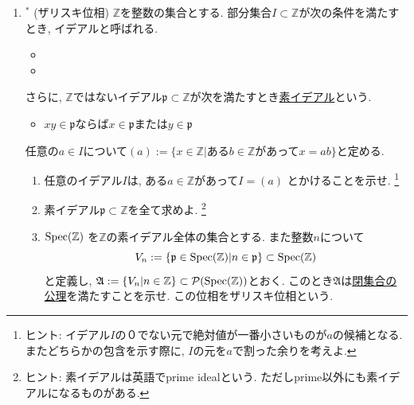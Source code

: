 \documentclass[dvipdfmx,a4paper,11pt]{article}
\newcommand{\Z}{\mathbb{Z}}
\theoremstyle{definition}
\begin{document}
\begin{enumerate}[label=\textbf{問}\ref*{sec-open}.\arabic*]
\item $^{*}$ \label{Zariski_topology} (ザリスキ位相)
$\Z$を整数の集合とする.
部分集合$I \subset \Z$が次の条件を満たすとき, イデアルと呼ばれる.
\begin{itemize}
	\setlength{\parskip}{0cm}
	\setlength{\itemsep}{0pt} 
\item {}
\item \text{$x\in I$, $a \in \Z$ならば$a x \in I$}
\end{itemize}
さらに, $\Z$ではないイデアル$\mathfrak{p} \subset \Z$が次を満たすとき\underline{素イデアル}という.
\begin{itemize}
	\setlength{\parskip}{0cm}
	\setlength{\itemsep}{0pt} 
\item $x y \in \mathfrak{p}$ならば$x \in \mathfrak{p}$または$y \in \mathfrak{p}$
\end{itemize}
任意の$a \in I$について$(a) :=  \{ x \in \Z | \text{ある$b \in \Z$があって$x =ab$}\}$と定める.
\begin{enumerate}
\setlength{\parskip}{0cm}
\setlength{\itemsep}{0pt} 
\item 任意のイデアル$I$は, ある$a \in \Z$があって$I = (a)$
とかけることを示せ. 
\footnote{ヒント: イデアル$I$の０でない元で絶対値が一番小さいものが$a$の候補となる. またどちらかの包含を示す際に, $I$の元を$a$で割った余りを考えよ. }
\item 素イデアル$\mathfrak{p}  \subset \Z$を全て求めよ. \footnote{ヒント: 素イデアルは英語でprime idealという. ただしprime以外にも素イデアルになるものがある.}
\item ${\rm Spec}(\Z)$ を$\Z$の素イデアル全体の集合とする. また整数$n$について
$$
V_{n} := \{ \mathfrak{p} \in {\rm Spec}(\Z) | n\in \mathfrak{p}\} \subset {\rm Spec}(\Z) 
$$
と定義し, $\mathfrak{A} := \{V_{n} | n \in \Z \} \subset \mathcal{P}({\rm Spec}(\Z) ) $とおく.
このとき$\mathfrak{A}$は\underline{閉集合の公理}を満たすことを示せ. この位相をザリスキ位相という. 
\end{enumerate}





\end{enumerate}
\end{document}
